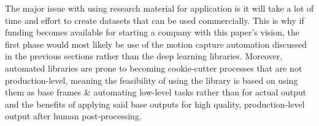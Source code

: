 The major issue with using research material for application is it will take a lot of time and effort to create datasets that can be used commercially. This is why if funding becomes available for starting a company with this paper's vision, the first phase would most likely be use of the motion capture automation discussed in the previous sections rather than the deep learning libraries. Moreover, automated libraries are prone to becoming cookie-cutter processes that are not production-level, meaning the feasibility of using the library is based on using them as base frames \& automating low-level tasks rather than for actual output and the benefits of applying said base outputs for high quality, production-level output after human post-processing.